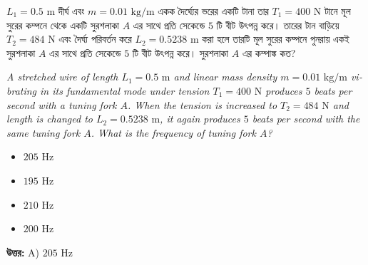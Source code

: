 \documentclass[12pt, a4paper]{article}
\begin{document}
\begin{tcolorbox}[questionbox={প্রশ্ন (Question) 21}]
    \noindent
    $L_1 = 0.5\text{ m}$ দীর্ঘ এবং $m = 0.01\text{ kg/m}$ একক দৈর্ঘ্যের ভরের একটি টানা তার $T_1 = 400\text{ N}$ টানে মূল সুরের কম্পনে থেকে একটি সুরশলাকা $A$ এর সাথে প্রতি সেকেন্ডে $5$ টি বীট উৎপন্ন করে। তারের টান বাড়িয়ে $T_2 = 484\text{ N}$ এবং দৈর্ঘ্য পরিবর্তন করে $L_2 = 0.5238\text{ m}$ করা হলে তারটি মূল সুরের কম্পনে পুনরায় একই সুরশলাকা $A$ এর সাথে প্রতি সেকেন্ডে $5$ টি বীট উৎপন্ন করে। সুরশলাকা $A$ এর কম্পাঙ্ক কত?
    
    \vspace{0.8em}
    \begin{english}
    \noindent\textit{\color{darkgray}
    A stretched wire of length $L_1 = 0.5\text{ m}$ and linear mass density $m = 0.01\text{ kg/m}$ vibrating in its fundamental mode under tension $T_1 = 400\text{ N}$ produces $5$ beats per second with a tuning fork $A$. When the tension is increased to $T_2 = 484\text{ N}$ and length is changed to $L_2 = 0.5238\text{ m}$, it again produces $5$ beats per second with the same tuning fork $A$. What is the frequency of tuning fork $A$?
    }
    \end{english}
\end{tcolorbox}

\begin{itemize}[label={}, leftmargin=1cm, itemsep=0.5em]
    \item[\textbf{A)}] $205\text{ Hz}$
    \item[\textbf{B)}] $195\text{ Hz}$
    \item[\textbf{C)}] $210\text{ Hz}$
    \item[\textbf{D)}] $200\text{ Hz}$
\end{itemize}

\vspace{0.5em}
\begin{tcolorbox}[answerbox]
    \textbf{\color{success} উত্তর:} A) $205\text{ Hz}$
\end{tcolorbox}
\vspace{1em}
\end{document}
